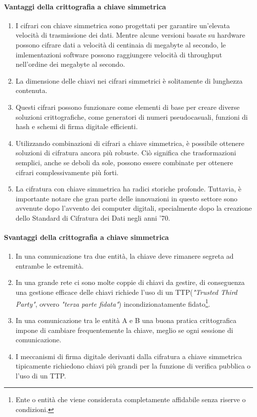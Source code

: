 \documentclass{article}
\theoremstyle{definition}
\begin{document}
\paragraph{Vantaggi della crittografia a chiave simmetrica}
\begin{enumerate}
    \item I cifrari con chiave simmetrica sono progettati per garantire un'elevata velocità di trasmissione dei dati. Mentre alcune versioni basate su hardware possono cifrare dati a velocità di centinaia di megabyte al secondo, le imlementazioni software possono raggiungere velocità di throughput nell'ordine dei megabyte al secondo.
    
    \item La dimensione delle chiavi nei cifrari simmetrici è solitamente di lunghezza contenuta.
    
    \item Questi cifrari possono funzionare come elementi di base per creare diverse soluzioni crittografiche, come generatori di numeri pseudocasuali, funzioni di hash e schemi di firma digitale efficienti.
    
    \item Utilizzando combinazioni di cifrari a chiave simmetrica, è possibile ottenere soluzioni di cifratura ancora più robuste. Ciò significa che trasformazioni semplici, anche se deboli da sole, possono essere combinate per ottenere cifrari complessivamente più forti.
    
    \item La cifratura con chiave simmetrica ha radici storiche profonde. Tuttavia, è importante notare che gran parte delle innovazioni in questo settore sono avvenute dopo l'avvento dei computer digitali, specialmente dopo la creazione dello Standard di Cifratura dei Dati negli anni '70.
\end{enumerate}

\paragraph{Svantaggi della crittografia a chiave simmetrica}\label{TTP}
\begin{enumerate}
    \item In una comunicazione tra due entità, la chiave deve rimanere segreta ad entrambe le estremità.
    \item In una grande rete ci sono molte coppie di chiavi da gestire, di conseguenza una gestione efficace delle chiavi richiede l'uso di un TTP(\textit{"Trusted Third Party"}, ovvero \textit{"terza parte fidata"}) incondizionatamente fidato\footnote{Ente o entità che viene considerata completamente affidabile senza riserve o condizioni.}.
    \item In una comunicazione tra le entità A e B una buona pratica crittografica impone di cambiare frequentemente la chiave, meglio se ogni sessione di comunicazione.
    \item I meccanismi di firma digitale derivanti dalla cifratura a chiave simmetrica tipicamente richiedono chiavi più grandi per la funzione di verifica pubblica o l'uso di un TTP.
\end{enumerate}
\end{document}
